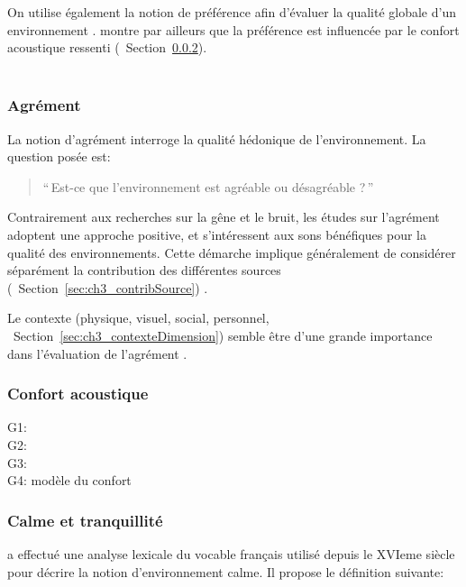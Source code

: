 On utilise également la notion de préférence afin d'évaluer la qualité globale d'un environnement \citep{yu2010factors}. \citep{hong2013designing} montre par ailleurs que la préférence est influencée par le confort acoustique ressenti (\cf~Section~\ref{sec:ch3_confort}).\\

\\


\subsubsection{Agrément}

La notion d'agrément interroge la qualité hédonique de l'environnement. La question posée est:

\begin{quote}
``\,Est-ce que l'environnement est agréable ou désagréable ?\,''
\end{quote}
 

Contrairement aux recherches sur la gêne et le bruit, les études sur l'agrément adoptent une approche positive, et s'intéressent aux sons bénéfiques pour la qualité des environnements. Cette démarche implique généralement de considérer séparément la contribution des différentes sources (\cf~Section~\ref{sec:ch3_contribSource})  \citep{lavandier2006contribution,garcia2012validation}.

Le contexte (physique, visuel, social, personnel, \cf~Section~\ref{sec:ch3_contexteDimension}) semble être d'une grande importance dans l'évaluation de l'agrément \citep{guillen2007importance}.

\subsubsection{Confort acoustique}
\label{sec:ch3_confort}

G1: \citep{yang2005acoustic,meng2013field}\\
G2: \citep{jeon2011non,jeon2013soundwalk}\\
G3: \citep{tse2012perception}\\
G4: \citep{yu2009modeling} modèle du confort

\subsubsection{Calme et tranquillité}

\citep{delaitre2012definition} a effectué une analyse lexicale du vocable  français utilisé depuis le XVIeme siècle pour décrire la notion d'environnement calme. Il propose le définition suivante:

